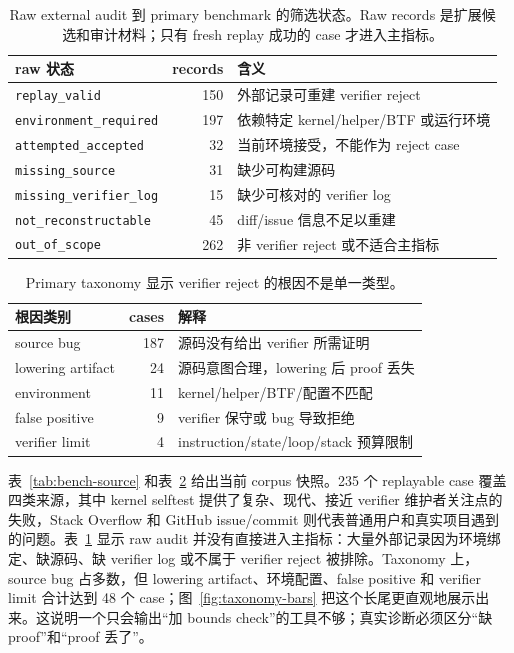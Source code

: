 \documentclass[letterpaper,twocolumn,10pt]{article}
\newcommand{\code}[1]{\texttt{#1}}
\begin{document}
\begin{table}[t]
\centering
\small
\caption{Raw external audit 到 primary benchmark 的筛选状态。Raw records 是扩展候选和审计材料；只有 fresh replay 成功的 case 才进入主指标。}
\label{tab:raw-funnel}
\begin{tabularx}{\columnwidth}{@{}l r X@{}}
\toprule
raw 状态 & records & 含义 \\
\midrule
\code{replay\_valid} & 150 & 外部记录可重建 verifier reject \\
\code{environment\_required} & 197 & 依赖特定 kernel/helper/BTF 或运行环境 \\
\code{attempted\_accepted} & 32 & 当前环境接受，不能作为 reject case \\
\code{missing\_source} & 31 & 缺少可构建源码 \\
\code{missing\_verifier\_log} & 15 & 缺少可核对的 verifier log \\
\code{not\_reconstructable} & 45 & diff/issue 信息不足以重建 \\
\code{out\_of\_scope} & 262 & 非 verifier reject 或不适合主指标 \\
\bottomrule
\end{tabularx}
\end{table}

\begin{table}[t]
\centering
\small
\caption{Primary taxonomy 显示 verifier reject 的根因不是单一类型。}
\label{tab:taxonomy}
\begin{tabularx}{\columnwidth}{@{}l r X@{}}
\toprule
根因类别 & cases & 解释 \\
\midrule
source bug & 187 & 源码没有给出 verifier 所需证明 \\
lowering artifact & 24 & 源码意图合理，lowering 后 proof 丢失 \\
environment & 11 & kernel/helper/BTF/配置不匹配 \\
false positive & 9 & verifier 保守或 bug 导致拒绝 \\
verifier limit & 4 & instruction/state/loop/stack 预算限制 \\
\bottomrule
\end{tabularx}
\end{table}

表~\ref{tab:bench-source} 和表~\ref{tab:taxonomy} 给出当前 corpus 快照。235 个 replayable case 覆盖四类来源，其中 kernel selftest 提供了复杂、现代、接近 verifier 维护者关注点的失败，Stack Overflow 和 GitHub issue/commit 则代表普通用户和真实项目遇到的问题。表~\ref{tab:raw-funnel} 显示 raw audit 并没有直接进入主指标：大量外部记录因为环境绑定、缺源码、缺 verifier log 或不属于 verifier reject 被排除。Taxonomy 上，source bug 占多数，但 lowering artifact、环境配置、false positive 和 verifier limit 合计达到 48 个 case；图~\ref{fig:taxonomy-bars} 把这个长尾更直观地展示出来。这说明一个只会输出“加 bounds check”的工具不够；真实诊断必须区分“缺 proof”和“proof 丢了”。
\end{document}
